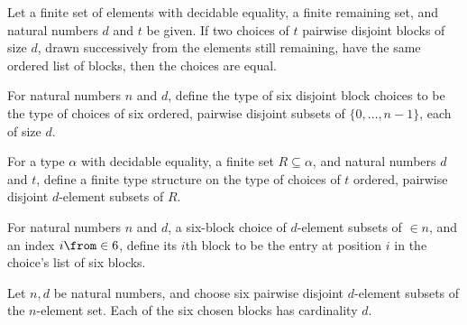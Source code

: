 \begin{theorem}
\label{FABL.DisjointBlockChoices.ext_of_blocks_eq}
\leanok
{}
Let a finite set of elements with decidable equality, a finite remaining set, and
natural numbers $d$ and $t$ be given. If two choices of $t$ pairwise disjoint blocks of
size $d$, drawn successively from the elements still remaining, have the same ordered
list of blocks, then the choices are equal.
\end{theorem}

\begin{definition}
\label{FABL.SixDisjointBlockChoice}
\leanok
{}
For natural numbers $n$ and $d$, define the type of six disjoint block choices to be the
type of choices of six ordered, pairwise disjoint subsets of $\{0,\ldots,n-1\}$, each of
size $d$.
\end{definition}

\begin{definition}
\label{FABL.disjointBlockChoicesFintype}
\leanok
{}
For a type $\alpha$ with decidable equality, a finite set $R\subseteq\alpha$, and
natural numbers $d$ and $t$, define a finite type structure on the type of choices of
$t$ ordered, pairwise disjoint $d$-element subsets of $R$.
\end{definition}

\begin{definition}
\label{FABL.SixDisjointBlockChoice.block}
\leanok
{}
For natural numbers $n$ and $d$, a six-block choice of $d$-element subsets of $\in n$,
and an index $i\from \in 6$, define its $i$th block to be the entry at position $i$ in
the choice’s list of six blocks.
\end{definition}

\begin{theorem}
\label{FABL.SixDisjointBlockChoice.block_card}
\leanok
{}
Let $n,d$ be natural numbers, and choose six pairwise disjoint $d$-element subsets of
the $n$-element set. Each of the six chosen blocks has cardinality $d$.
\end{theorem}

